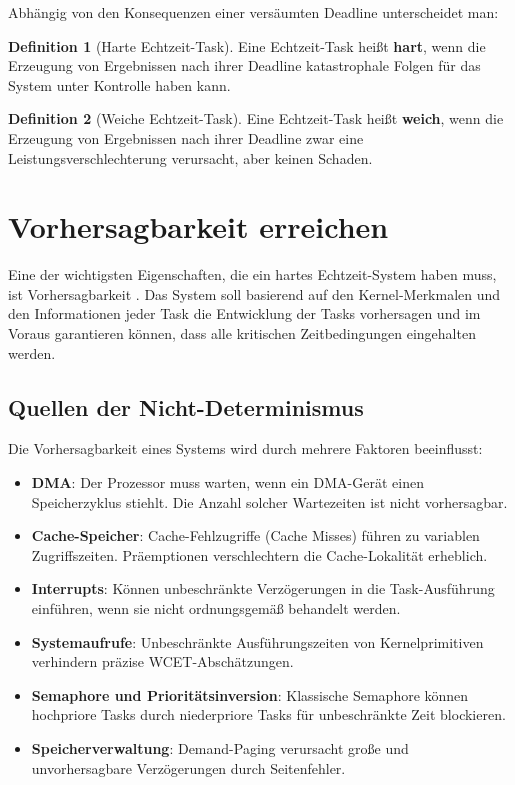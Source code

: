﻿\documentclass[a4paper,12pt]{report}
\theoremstyle{definition}
\newtheorem{definition}{Definition}[chapter]
\begin{document}
Abhängig von den Konsequenzen einer versäumten Deadline unterscheidet man:

\begin{definition}[Harte Echtzeit-Task]
	Eine Echtzeit-Task heißt \textbf{hart}, wenn die Erzeugung von Ergebnissen nach
	ihrer Deadline katastrophale Folgen für das System unter Kontrolle haben kann.
\end{definition}

\begin{definition}[Weiche Echtzeit-Task]
	Eine Echtzeit-Task heißt \textbf{weich}, wenn die Erzeugung von Ergebnissen nach
	ihrer Deadline zwar eine Leistungsverschlechterung verursacht, aber keinen Schaden.
\end{definition}

\section{Vorhersagbarkeit erreichen}

Eine der wichtigsten Eigenschaften, die ein hartes Echtzeit-System haben muss,
ist Vorhersagbarkeit \cite{Stankovic1988}. Das System soll basierend auf den
Kernel-Merkmalen und den Informationen jeder Task die Entwicklung der Tasks vorhersagen
und im Voraus garantieren können, dass alle kritischen Zeitbedingungen eingehalten werden.

\subsection{Quellen der Nicht-Determinismus}

Die Vorhersagbarkeit eines Systems wird durch mehrere Faktoren beeinflusst:

\begin{itemize}
	\item \textbf{DMA}: Der Prozessor muss warten, wenn ein DMA-Gerät einen Speicherzyklus
	      stiehlt. Die Anzahl solcher Wartezeiten ist nicht vorhersagbar.
	\item \textbf{Cache-Speicher}: Cache-Fehlzugriffe (Cache Misses) führen zu variablen
	      Zugriffszeiten. Präemptionen verschlechtern die Cache-Lokalität erheblich.
	\item \textbf{Interrupts}: Können unbeschränkte Verzögerungen in die Task-Ausführung
	      einführen, wenn sie nicht ordnungsgemäß behandelt werden.
	\item \textbf{Systemaufrufe}: Unbeschränkte Ausführungszeiten von Kernelprimitiven
	      verhindern präzise WCET-Abschätzungen.
	\item \textbf{Semaphore und Prioritätsinversion}: Klassische Semaphore können
	      hochpriore Tasks durch niederpriore Tasks für unbeschränkte Zeit blockieren.
	\item \textbf{Speicherverwaltung}: Demand-Paging verursacht große und unvorhersagbare
	      Verzögerungen durch Seitenfehler.
\end{itemize}
\end{document}

